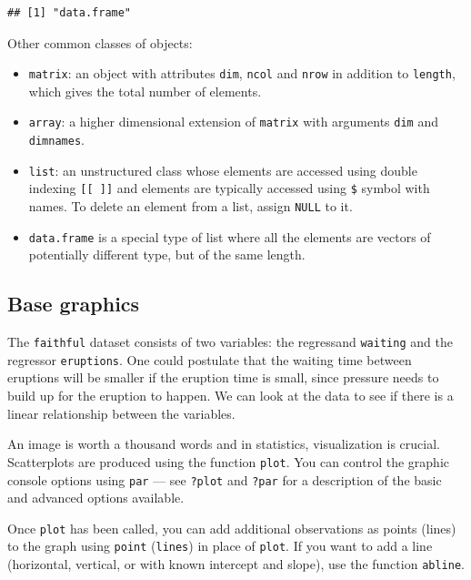 \documentclass[
  11pt,
  letterpaper,
]{book}
\providecommand{\tightlist}{%
  \setlength{\itemsep}{0pt}\setlength{\parskip}{0pt}}
\theoremstyle{definition}
\theoremstyle{definition}
\theoremstyle{definition}
\theoremstyle{definition}
\theoremstyle{remark}
\begin{document}
\begin{verbatim}
## [1] "data.frame"
\end{verbatim}

Other common classes of objects:

\begin{itemize}
\tightlist
\item
  \texttt{matrix}: an object with attributes \texttt{dim}, \texttt{ncol} and \texttt{nrow} in addition to \texttt{length}, which gives the total number of elements.
\item
  \texttt{array}: a higher dimensional extension of \texttt{matrix} with arguments \texttt{dim} and \texttt{dimnames}.
\item
  \texttt{list}: an unstructured class whose elements are accessed using double indexing \texttt{{[}{[}\ {]}{]}} and elements are typically accessed using \texttt{\$} symbol with names. To delete an element from a list, assign \texttt{NULL} to it.
\item
  \texttt{data.frame} is a special type of list where all the elements are vectors of potentially different type, but of the same length.
\end{itemize}

\hypertarget{base-graphics}{%
\subsection*{Base graphics}\label{base-graphics}}

The \texttt{faithful} dataset consists of two variables: the regressand \texttt{waiting} and the regressor \texttt{eruptions}. One could postulate that the waiting time between eruptions will be smaller if the eruption time is small, since pressure needs to build up for the eruption to happen. We can look at the data to see if there is a linear relationship between the variables.

An image is worth a thousand words and in statistics, visualization is crucial. Scatterplots are produced using the function \texttt{plot}. You can control the graphic console options using \texttt{par} --- see \texttt{?plot} and \texttt{?par} for a description of the basic and advanced options available.

Once \texttt{plot} has been called, you can add additional observations as points (lines) to the graph using \texttt{point} (\texttt{lines}) in place of \texttt{plot}. If you want to add a line (horizontal, vertical, or with known intercept and slope), use the function \texttt{abline}.
\end{document}

